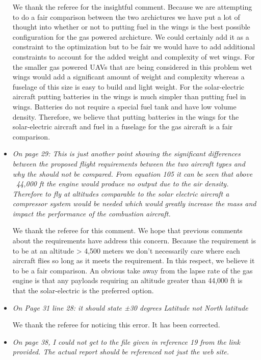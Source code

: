 \documentclass[10pt, a4paper]{article}
\begin{document}
\begin{itemize}
        We thank the referee for the insightful comment.  Because we are attempting to do a fair comparison between the two archictures we have put a lot of thought into whether or not to putting fuel in the wings is the best possible configuration for the gas powered archicture.  We could certainly add it as a constraint to the optimization but to be fair we would have to add additional constraints to account for the added weight and complexity of wet wings.  For the smaller gas powered UAVs that are being considered in this problem wet wings would add a significant amount of weight and complexity whereas a fuselage of this size is easy to build and light weight.  For the solar-electric aircraft putting batteries in the wings is much simpler than putting fuel in wings.  Batteries do not require a special fuel tank and have low volume density.  Therefore, we believe that putting batteries in the wings for the solar-electric aircraft and fuel in a fuselage for the gas aircraft is a fair comparison. 

    \item \emph{On page 29: This is just another point showing the significant differences between the proposed flight requirements between the two aircraft types and why the should not be compared. From equation 105 it can be seen that above ~44,000 ft the engine would produce no output due to the air density. Therefore to fly at altitudes comparable to the solar electric aircraft a compressor system would be needed which would greatly increase the mass and impact the performance of the combustion aircraft.}

        We thank the referee for this comment.  We hope that previous comments about the requirements have address this concern.  Because the requirement is to be at an altitude > 4,500 meters we don't necessarily care where each aircraft flies so long as it meets the requirement.  In this respect, we believe it to be a fair comparison.  An obvious take away from the lapse rate of the gas engine is that any payloads requiring an altitude greater than 44,000 ft is that the solar-electric is the preferred option. 

    \item \emph{On Page 31 line 28: it should state ±30 degrees Latitude not North latitude}

        We thank the referee for noticing this error.  It has been corrected. 

    \item \emph{On page 38, I could not get to the file given in reference 19 from the link provided. The actual report should be referenced not just the web site.}
    \end{itemize}
\end{document}

